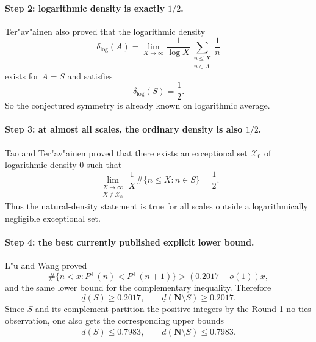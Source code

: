 \paragraph{Step 2: logarithmic density is exactly $1/2$.}
Ter"av"ainen also proved that the logarithmic density
\[
\delta_{\log}(A)=\lim_{X\to\infty}\frac{1}{\log X}\sum_{\substack{n\leq X\\ n\in A}}\frac{1}{n}
\]
exists for $A=S$ and satisfies
\[
\delta_{\log}(S)=\frac{1}{2}.
\]
So the conjectured symmetry is already known on logarithmic average.

\paragraph{Step 3: at almost all scales, the ordinary density is also $1/2$.}
Tao and Ter"av"ainen proved that there exists an exceptional set $\mathcal X_{0}$ of logarithmic density $0$ such that
\[
\lim_{\substack{X\to\infty\\ X\notin \mathcal X_{0}}}
\frac{1}{X}\#\{n\leq X: n\in S\}=\frac{1}{2}.
\]
Thus the natural-density statement is true for all scales outside a logarithmically negligible exceptional set.

\paragraph{Step 4: the best currently published explicit lower bound.}
L"u and Wang proved
\[
\#\{n<x:P^{+}(n)<P^{+}(n+1)\}>(0.2017-o(1))x,
\]
and the same lower bound for the complementary inequality. Therefore
\[
\underline d(S)\geq 0.2017,
\qquad
\underline d(\mathbf N\setminus S)\geq 0.2017.
\]
Since $S$ and its complement partition the positive integers by the Round-1 no-ties observation, one also gets the corresponding upper bounds
\[
\overline d(S)\leq 0.7983,
\qquad
\overline d(\mathbf N\setminus S)\leq 0.7983.
\]

